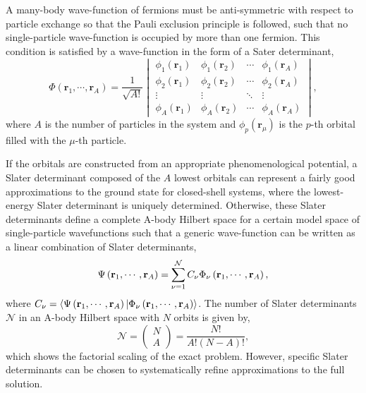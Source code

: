 \documentclass[thesis.tex]{subfiles}
\begin{document}
A many-body wave-function of fermions must be anti-symmetric with respect to particle exchange so that the Pauli exclusion principle is followed, such that no single-particle wave-function is occupied by more than one fermion.  This condition is satisfied by a wave-function in the form of a Sater determinant,
\begin{equation} \label{eq:slaterdeterminant}
  \Phi\left(\mathbf{r}_{1},\cdots,\mathbf{r}_{A}\right) =
  \frac{1}{\sqrt{A!}}\begin{vmatrix}
    \phi_{1}\left(\mathbf{r}_{1}\right) & \phi_{1}\left(\mathbf{r}_{2}\right) & \cdots & \phi_{1}\left(\mathbf{r}_{A}\right) \\
    \phi_{2}\left(\mathbf{r}_{1}\right) & \phi_{2}\left(\mathbf{r}_{2}\right) & \cdots & \phi_{2}\left(\mathbf{r}_{A}\right) \\
    \vdots & \vdots & \ddots & \vdots \\
    \phi_{A}\left(\mathbf{r}_{1}\right) & \phi_{A}\left(\mathbf{r}_{2}\right) & \cdots & \phi_{A}\left(\mathbf{r}_{A}\right)
  \end{vmatrix},
\end{equation}
where $A$ is the number of particles in the system and $\phi_{p}\left(\mathbf{r}_{\mu}\right)$ is the $p$-th orbital filled with the $\mu$-th particle.

If the orbitals are constructed from an appropriate phenomenological potential, a Slater determinant composed of the $A$ lowest orbitals can represent a fairly good approximations to the ground state for closed-shell systems, where the lowest-energy Slater determinant is uniquely determined. Otherwise, these Slater determinants define a complete A-body Hilbert space for a certain model space of single-particle wavefunctions such that a generic wave-function can be written as a linear combination of Slater determinants,
\begin{equation}
  \Psi\left(\mathbf{r}_{1},\cdots,\mathbf{r}_{A}\right) = \sum_{\mathclap{\nu = 1}}^{\mathcal{N}} C_{\nu}\Phi_{\nu}\left(\mathbf{r}_{1},\cdots,\mathbf{r}_{A}\right),
\end{equation}
where $C_{\nu} = \langle \Psi\left(\mathbf{r}_{1},\cdots,\mathbf{r}_{A}\right) | \Phi_{\nu}\left(\mathbf{r}_{1},\cdots,\mathbf{r}_{A}\right)\rangle$.  The number of Slater determinants $\mathcal{N}$ in an A-body Hilbert space with $N$ orbits is given by,
\begin{equation} \label{eq:factorialscaling}
  \mathcal{N} = \left(\begin{matrix} N \\ A \end{matrix}\right) = \frac{N!}{A!(N - A)!},
\end{equation}
which shows the factorial scaling of the exact problem.  However, specific Slater determinants can be chosen to systematically refine approximations to the full solution.
\end{document}
